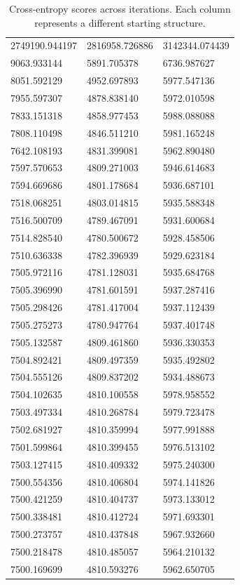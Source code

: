 \begin{table}\begin{tabular}{|l|l|l|}
\hline
2749190.944197&2816958.726886&3142344.074439\\
9063.933144&5891.705378&6736.987627\\
8051.592129&4952.697893&5977.547136\\
7955.597307&4878.838140&5972.010598\\
7833.151318&4858.977453&5988.088088\\
7808.110498&4846.511210&5981.165248\\
7642.108193&4831.399081&5962.890480\\
7597.570653&4809.271003&5946.614683\\
7594.669686&4801.178684&5936.687101\\
7518.068251&4803.014815&5935.588348\\
7516.500709&4789.467091&5931.600684\\
7514.828540&4780.500672&5928.458506\\
7510.636338&4782.396939&5929.623184\\
7505.972116&4781.128031&5935.684768\\
7505.396990&4781.601591&5937.287416\\
7505.298426&4781.417004&5937.112439\\
7505.275273&4780.947764&5937.401748\\
7505.132587&4809.461860&5936.330353\\
7504.892421&4809.497359&5935.492802\\
7504.555126&4809.837202&5934.488673\\
7504.102635&4810.100558&5978.958552\\
7503.497334&4810.268784&5979.723478\\
7502.681927&4810.359994&5977.991888\\
7501.599864&4810.399455&5976.513102\\
7503.127415&4810.409332&5975.240300\\
7500.554356&4810.406804&5974.141826\\
7500.421259&4810.404737&5973.133012\\
7500.338481&4810.412724&5971.693301\\
7500.273757&4810.437848&5967.932660\\
7500.218478&4810.485057&5964.210132\\
7500.169699&4810.593276&5962.650705\\
\hline
\end{tabular}\caption{
  Cross-entropy scores across iterations. Each column represents a different starting structure.}\end{table}

